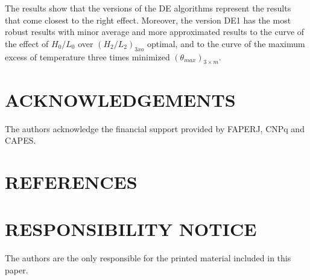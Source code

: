 \documentclass[10pt,fleqn,a4paper,twoside]{article}
\begin{document}
The results show that the versions of the DE algorithms represent the results that come closest to the right effect. Moreover, the version DE1 has the most robust results with minor average and more approximated results to the curve of the effect of $H_{0}/L_{0}$ over $(H_{2}/L_{2})_{3xo}$ optimal, and to the curve of the maximum excess of temperature three times minimized $({\theta}_{max})_{3\times m}$.


\section{ACKNOWLEDGEMENTS}

The authors acknowledge the financial support provided by FAPERJ, CNPq and CAPES.

\section{REFERENCES} 


\renewcommand{\refname}{}


\section{RESPONSIBILITY NOTICE}

The authors are the only responsible for the printed material included in this paper.
\end{document}
